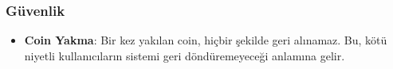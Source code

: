 \subsubsection{Güvenlik}

\begin{itemize}
    \item \textbf{Coin Yakma}: Bir kez yakılan coin, hiçbir şekilde geri alınamaz. Bu, kötü niyetli kullanıcıların sistemi geri döndüremeyeceği anlamına gelir.
\end{itemize}

\newpage